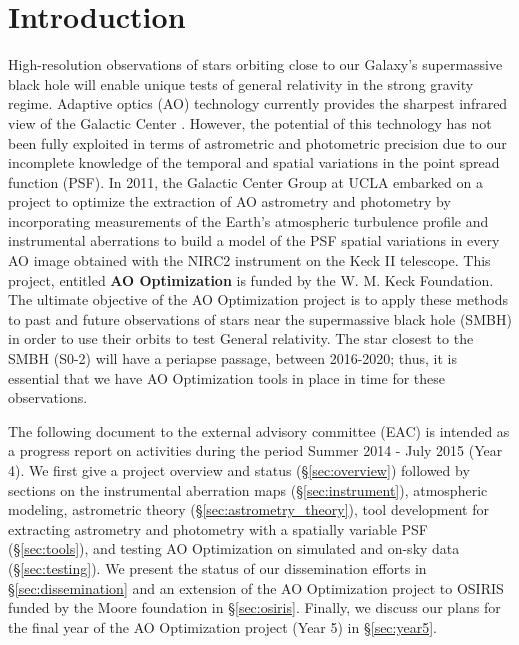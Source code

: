 \section{Introduction}

High-resolution observations of stars orbiting close to our Galaxy's supermassive black hole will enable unique tests of general relativity in the strong gravity regime. Adaptive optics (AO) technology currently provides the sharpest infrared view of the Galactic Center \cite{Ghez_2005}. However, the potential of this technology has not been fully exploited in terms of astrometric and photometric precision due to our incomplete knowledge of the temporal and spatial variations in the point spread function (PSF). In 2011, the Galactic Center Group at UCLA embarked on a project to optimize the extraction of AO astrometry and photometry by incorporating measurements of the Earth's atmospheric turbulence profile and instrumental aberrations to build a model of the PSF spatial variations in every AO image obtained with the NIRC2 instrument on the Keck II telescope. This project, entitled \textbf{AO Optimization} is funded by the W. M. Keck Foundation. The ultimate objective of the AO Optimization project is to apply these methods to past and future observations of stars near the supermassive black hole (SMBH) in order to use their orbits to test General relativity. The star closest to the SMBH (S0-2) will have a periapse passage, between 2016-2020; thus, it is essential that we have AO Optimization tools in place in time for these observations. 

The following document to the external advisory committee (EAC) is intended as a progress report on activities during the period Summer 2014 - July 2015 (Year 4). We first give a project overview and status (\S\ref{sec:overview}) followed by sections on the instrumental aberration maps (\S\ref{sec:instrument}), atmospheric modeling, astrometric theory (\S\ref{sec:astrometry_theory}), tool development for extracting astrometry and photometry with a spatially variable PSF (\S\ref{sec:tools}), and testing AO Optimization on simulated and on-sky data (\S\ref{sec:testing}). We present the status of our dissemination efforts in \S\ref{sec:dissemination} and an extension of the AO Optimization project to OSIRIS funded by the Moore foundation in \S\ref{sec:osiris}. Finally, we discuss our plans for the final year of the AO Optimization project (Year 5) in \S\ref{sec:year5}.





    
    
    
    
    
    
    
  
  
  
  
  